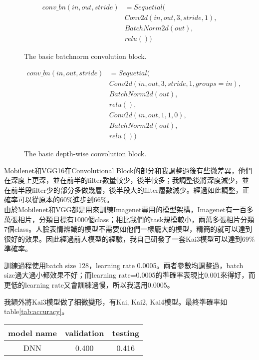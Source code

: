 \documentclass[12pt, a4paper]{article}
\begin{document}
\begin{enumerate}
\begin{figure}[h]
    \begin{align*}
        conv\_bn(in,out,stride) &= Sequetial(\\
        &Conv2d(in, out, 3, stride, 1),\\
        &BatchNorm2d(out),\\
        &relu())
    \end{align*}
    \caption{The basic batchnorm convolution block.}
    \label{fig:conv_bn}
\end{figure}

\begin{figure}[h]
    \begin{align*}
        conv\_bn(in,out,stride) &= Sequetial(\\
        &Conv2d(in, out, 3, stride, 1, groups=in),\\
        &BatchNorm2d(out),\\
        &relu(),\\
        &Conv2d(in, out, 1, 1, 0),\\
        &BatchNorm2d(out),\\
        &relu())
    \end{align*}
    \caption{The basic depth-wise convolution block.}
    \label{fig:conv_dw}
\end{figure}
Mobilenet和VGG16在Convolutional Block的部分和我調整過後有些微差異，他們在深度上更深，並在前半的filter數量較少，後半較多；我調整後將深度減少，並在前半段filter少的部分多做幾層，後半段大的filter層數減少。經過如此調整，正確率可以從原本的$60\%$進步到$66\%$。\\
由於Mobilenet和VGG都是用來訓練Imagenet專用的模型架構，Imagenet有一百多萬張相片，分類目標有1000個class；相比我們的task規模較小，兩萬多張相片分類7個class。人臉表情辨識的模型不需要如他們一樣龐大的模型，精簡的就可以達到很好的效果。因此經過前人模型的經驗，我自己研發了一套Kai3模型可以達到$69\%$準確率。\par
訓練過程使用batch size 128，learning rate 0.0005。兩者參數均調整過，batch size過大過小都效果不好；而learning rate=0.0005的準確率表現比0.001來得好，而更低的learning rate又會訓練過慢，所以我選用0.0005。\par
我額外將Kai3模型做了細微變形，有Kai, Kai2, Kai4模型。最終準確率如table\ref{tab:accuracy}。
\begin{table}[h]
    \centering
    \begin{tabular}{|c|c|c|} \hline
        model name&validation&testing\\ \hline
        DNN&0.400&0.416\\ \hline

\end{tabular}
\end{table}
\end{enumerate}
\end{document}

